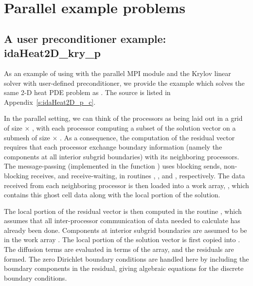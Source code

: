 \section{Parallel example problems}\label{s:ex_parallel}

\subsection{A user preconditioner example: idaHeat2D\_kry\_p}\label{ss:idaHeat2D_p}

As an example of using {\ida} with the parallel MPI {\nvecp} module and the Krylov 
linear solver {\idaspgmr} with user-defined preconditioner, we provide the example
 which solves the same 2-D heat PDE problem as . 
The source is listed in Appendix~\ref{s:idaHeat2D_p_c}.

In the parallel setting, we can think of the processors as being laid out
in a grid of size  $\times$ , with each processor computing
a subset of the solution vector on a submesh of size  $\times$
.  As a consequence, the computation of the residual
vector requires that each processor exchange boundary information
(namely the components at all interior subgrid boundaries) with its
neighboring processors.  The message-passing (implemented in the
function ) uses blocking sends, non-blocking receives, and
receive-waiting, in routines , , and
, respectively.  The data received from each neighboring
processor is then loaded into a work array, , which contains
this ghost cell data along with the local portion of the solution.

The local portion of the residual vector is then computed in the
routine , which assumes that all inter-processor
communication of data needed to calculate  has already been
done.  Components at interior subgrid boundaries are assumed to be in
the work array .  The local portion of the solution vector
 is first copied into .  The diffusion terms are
evaluated in terms of the  array, and the residuals are
formed.  The zero Dirichlet boundary conditions are handled here by
including the boundary components in the residual, giving algebraic
equations for the discrete boundary conditions.

